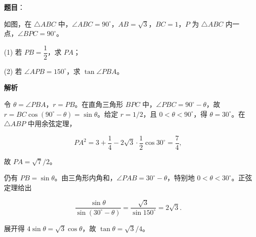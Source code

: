 \begin{answer}

\textbf{题目}：

如图，在 $\triangle ABC$ 中，$\angle ABC=90^\circ$，$AB=\sqrt3$，$BC=1$，$P$ 为 $\triangle ABC$ 内一点，$\angle BPC=90^\circ$。
\nopagebreak[4]
\begin{center}\end{center}
\nopagebreak[4]
(1) 若 $PB=\dfrac12$，求 $PA$；

(2) 若 $\angle APB=150^\circ$，求 $\tan\angle PBA$。

\textbf{解析}


令 $\theta=\angle PBA$，$r=PB$。在直角三角形 $BPC$ 中，$\angle PBC=90^\circ-\theta$，故 $r=BC\cos(90^\circ-\theta)=\sin\theta$。给定 $r=1/2$，且 $0<\theta<90^\circ$，得 $\theta=30^\circ$。在 $\triangle ABP$ 中用余弦定理，

\nopagebreak[4]
\[
PA^2=3+\frac14-2\sqrt3\cdot\frac12\cos30^\circ=\frac74,
\]

故 $PA=\sqrt7/2$。


仍有 $PB=\sin\theta$。由三角形内角和，$\angle PAB=30^\circ-\theta$，特别地 $0<\theta<30^\circ$。正弦定理给出

\nopagebreak[4]
\[
\frac{\sin\theta}{\sin(30^\circ-\theta)}
=\frac{\sqrt3}{\sin150^\circ}=2\sqrt3.
\]

展开得 $4\sin\theta=\sqrt3\cos\theta$，故 $\tan\theta=\sqrt3/4$。



\end{answer}
